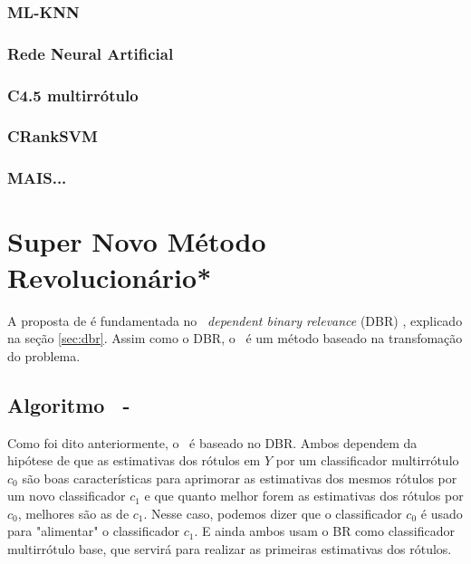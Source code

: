 \subsection{ML-KNN}
\subsection{Rede Neural Artificial}
\subsection{C4.5 multirrótulo}
\subsection{CRankSVM}
\subsection{MAIS...}


\chapter{Super Novo Método Revolucionário*}
A proposta de \MRLM é fundamentada no \MML~\textit{dependent binary relevance} (DBR) \cite{dbr2014}, explicado
na seção \ref{sec:dbr}. Assim como o DBR, o \MRLMa~é um método baseado na transfomação do problema.


\section{Algoritmo \MRLM~-~\MRLMa}
Como foi dito anteriormente, o \MRLM~é baseado no DBR. 
Ambos dependem da hipótese de que as estimativas dos rótulos em $Y$ por um classificador multirrótulo $c_0$
são boas características para aprimorar as estimativas dos mesmos rótulos por um novo classificador $c_1$
e que quanto melhor forem as estimativas dos rótulos por $c_0$, melhores são as de $c_1$. Nesse caso, podemos dizer
que o classificador $c_0$ é usado para "alimentar" o classificador $c_1$.
E ainda ambos usam o BR como classificador multirrótulo base, que servirá para realizar as primeiras estimativas dos 
rótulos.

